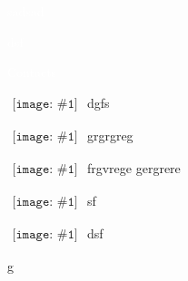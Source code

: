 \documentclass{article}
\newcommand{\ContactEntry}[2]{
	$\begin{array}{l}
	{\texttt{[image: \#1]}}
	\end{array}
	$ #2
}
\begin{document}
	\color{textGray}
	\vspace*{105pt} %
	\Huge
	\BgThispage
		\textcolor{white}{sadsad}

		\textcolor{white}{dsf}
	\BgThispage
	\vspace*{20pt}

	
\LARGE
\noindent\colorbox{materialGreen}
{\parbox[c][25pt][c]{\textwidth}{\hspace{15pt}\textcolor{white}{Contacts}}} %

\begin{multicols}{2}

\large
\ContactEntry{images/green/telephone1}{dgfs}

\ContactEntry{images/green/mail9}{grgrgreg}

\ContactEntry{images/green/links1}{ frgvrege gergrere}

\columnbreak

\ContactEntry{images/green/house3}{sf}

\ContactEntry{images/green/map5}{dsf

\hspace*{25pt} g}

\end{multicols}
\end{document}
